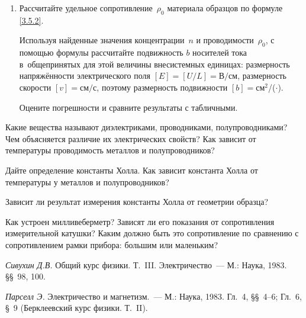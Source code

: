 \begin{lab:task}
\begin{enumerate}
{Для цинка изобразите на графике зависимость $V_{xy}=f(B)$ и по наклону прямой
рассчитайте постоянную Холла.

Для обоих образцов рассчитайте концентрацию~$n$ носителей тока по формуле
.

Оцените погрешности и сравните результаты с табличными.}

\item{ Рассчитайте удельное сопротивление~$\rho_0$ материала образцов по формуле
\eqref{3.5.2}.

Используя найденные значения концентрации~$n$ и проводимости~$\rho_0$, с помощью
формулы  рассчитайте подвижность $b$ носителей тока
в~общепринятых для этой величины внесистемных единицах: размерность
напряжённости электрического поля $[E] = [U/L]=\text{В/см}$, размерность
скорости $[v]=\text{см/с}$, поэтому размерность подвижности
$[b]=$см$^2$/($\cdot$).

Оцените погрешности и сравните результаты с табличными.
}
\end{enumerate}

\end{lab:task}

\begin{lab:questions}

\item{ Какие вещества называют диэлектриками, проводниками, полупроводниками?
Чем объясняется различие их электрических свойств? Как зависит от температуры
проводимость металлов и полупроводников?}

\item{ Дайте определение константы Холла. Как зависит константа Холла от
температуры у металлов и полупроводников?}

\item{ Зависит ли результат измерения константы Холла от геометрии образца?}

\item{ Как устроен милливеберметр? Зависят ли его показания от сопротивления
измерительной катушки? Каким должно быть это сопротивление по сравнению с
сопротивлением рамки прибора: большим или маленьким?}

\end{lab:questions}

\begin{lab:literature}

\item{ \emph{Сивухин Д.В.} Общий курс физики. Т.~III. Электричество~--- М.:
Наука, 1983. \S\S~98, 100.}

\item{ \emph{Парселл Э.} Электричество и магнетизм.~--- М.: Наука, 1983. Гл.~4,
\S\S~4--6; Гл.~6, \S~9 (Берклеевский курс физики. Т.~II).}
\end{lab:literature}
